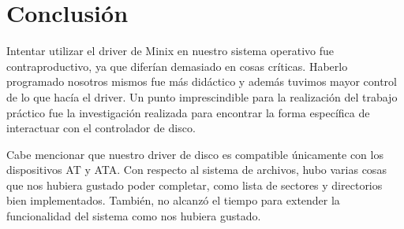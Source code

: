 \documentclass[a4paper,10pt]{article}
\begin{document}
\section{Conclusión}
Intentar utilizar el driver de Minix en nuestro sistema operativo fue contraproductivo, ya que diferían demasiado en cosas críticas. Haberlo 
programado nosotros mismos fue más didáctico y además tuvimos mayor control de lo que hacía el driver. Un punto imprescindible para la realización 
del trabajo práctico fue la investigación realizada para encontrar la forma específica de interactuar con el controlador de disco. \par
\par
Cabe mencionar que nuestro driver de disco es compatible únicamente con los dispositivos AT y ATA. 
Con respecto al sistema de archivos, hubo varias cosas que nos hubiera gustado poder completar, como lista de sectores y directorios bien implementados. También, no alcanzó el tiempo para extender la funcionalidad del sistema como nos hubiera gustado. 

  
\end{document}
